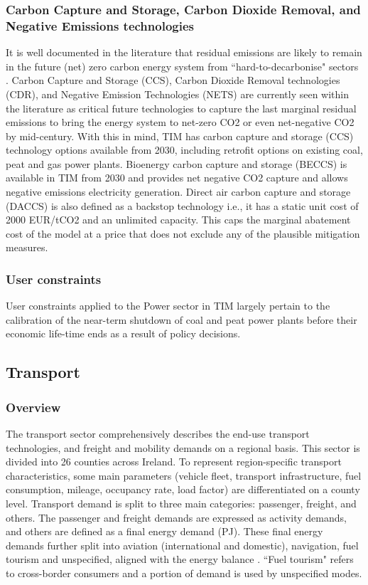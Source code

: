 \documentclass[gmd,manuscript]{copernicus}
\begin{document}
\subsubsection{Carbon Capture and Storage, Carbon Dioxide Removal, and Negative Emissions technologies}
It is well documented in the literature that residual emissions are likely to remain in the future (net) zero carbon energy system from ``hard-to-decarbonise" sectors \citep{Rogelj2018}. Carbon Capture and Storage (CCS), Carbon Dioxide Removal technologies (CDR), and Negative Emission Technologies (NETS) are currently seen within the literature as critical future technologies to capture the last marginal residual emissions to bring the energy system to net-zero CO2 or even net-negative CO2 by mid-century. With this in mind, TIM has carbon capture and storage (CCS) technology options available from 2030, including retrofit options on existing coal, peat and gas power plants. Bioenergy carbon capture and storage (BECCS) is available in TIM from 2030 and provides net negative CO2 capture and allows negative emissions electricity generation. Direct air carbon capture and storage (DACCS) is also defined as a backstop technology i.e., it has a static unit cost of 2000 EUR/tCO2 and an unlimited capacity. This caps the marginal abatement cost of the model at a price that does not exclude any of the plausible mitigation measures.

\subsubsection{User constraints}
User constraints applied to the Power sector in TIM largely pertain to the calibration of the near-term shutdown of coal and peat power plants before their economic life-time ends as a result of policy decisions. 

\subsection{Transport}
\label{ss:transport}

\subsubsection{Overview}
The transport sector comprehensively describes the end-use transport technologies, and freight and mobility demands on a regional basis. This sector is divided into 26 counties across Ireland. To represent region-specific transport characteristics, some main parameters (vehicle fleet, transport infrastructure, fuel consumption, mileage, occupancy rate, load factor) are differentiated on a county level. Transport demand is split to three main categories: passenger, freight, and others. The passenger and freight demands are expressed as activity demands, and others are defined as a final energy demand (PJ). These final energy demands further split into aviation (international and domestic), navigation, fuel tourism and unspecified, aligned with the energy balance \citep{SEAI2019}. ``Fuel tourism" refers to cross-border consumers and a portion of demand is used by unspecified modes. 
\end{document}
